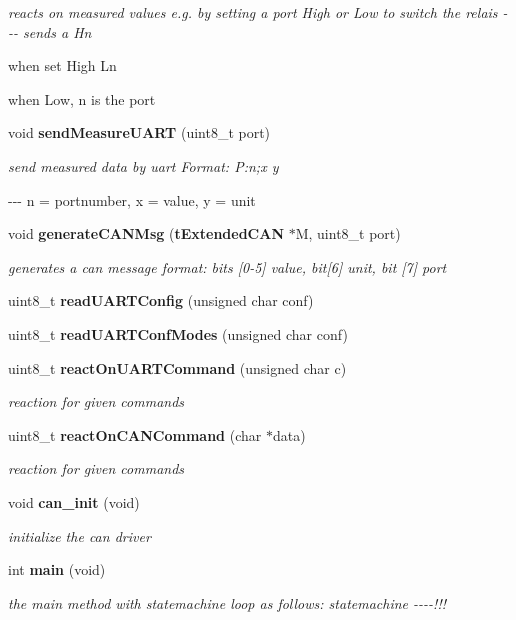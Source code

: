 \begin{DoxyCompactItemize}
\begin{DoxyCompactList}\small\item\em reacts on measured values e.\-g. by setting a port \-High or \-Low to switch the relais -\/-\/-\/ sends a \-Hn\par
 when set \-High \-Ln\par
 when \-Low, n is the port \end{DoxyCompactList}\item 
void {\bf send\-Measure\-U\-A\-R\-T} (uint8\-\_\-t port)
\begin{DoxyCompactList}\small\item\em send measured data by uart \-Format\-: \-P\-:n;x y \par
 -\/-\/-\/ n = portnumber, x = value, y = unit \end{DoxyCompactList}\item 
void {\bf generate\-C\-A\-N\-Msg} ({\bf t\-Extended\-C\-A\-N} $\ast$\-M, uint8\-\_\-t port)
\begin{DoxyCompactList}\small\item\em generates a can message format\-: bits [0-\/5] value, bit[6] unit, bit [7] port \end{DoxyCompactList}\item 
uint8\-\_\-t {\bfseries read\-U\-A\-R\-T\-Config} (unsigned char conf)\label{group__main_gaf04f40a07e81cb2ca26d3d8922664937}

\item 
uint8\-\_\-t {\bfseries read\-U\-A\-R\-T\-Conf\-Modes} (unsigned char conf)\label{group__main_gadc64e664206404b3c654bcd71d0e1d5e}

\item 
uint8\-\_\-t {\bf react\-On\-U\-A\-R\-T\-Command} (unsigned char c)
\begin{DoxyCompactList}\small\item\em reaction for given commands \end{DoxyCompactList}\item 
uint8\-\_\-t {\bf react\-On\-C\-A\-N\-Command} (char $\ast$data)
\begin{DoxyCompactList}\small\item\em reaction for given commands \end{DoxyCompactList}\item 
void {\bf can\-\_\-init} (void)\label{group__main_gac7781a37ca14c5bf42c4fe9de1f4daa8}

\begin{DoxyCompactList}\small\item\em initialize the can driver \end{DoxyCompactList}\item 
int {\bf main} (void)
\begin{DoxyCompactList}\small\item\em the main method with statemachine loop as follows\-: statemachine -\/-\/-\/-\/!!! \end{DoxyCompactList}\end{DoxyCompactItemize}

